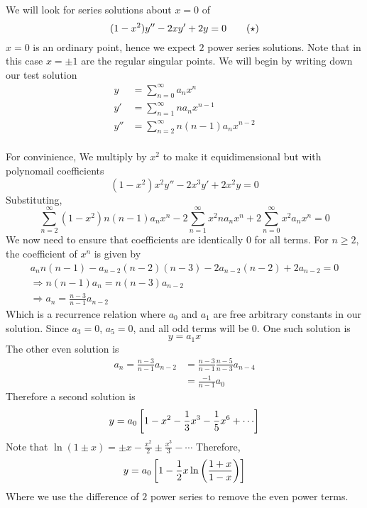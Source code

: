 \documentclass{article}
\begin{document}
\begin{eg}
    We will look for series solutions about $x = 0$ of
    \[
        (1 - x^2)y'' - 2x y' + 2y = 0 \tagstar  
    \]
    $x = 0$ is an ordinary point, hence we expect $2$ power series solutions.
    Note that in this case $x = \pm 1$ are the regular singular points.
    We will begin by writing down our test solution
    \begin{align*}
        y &= \sum_{n=0}^{\infty} a_n x^n \\
        y' &= \sum_{n=1}^{\infty} n a_n x^{n-1} \\
        y'' &= \sum_{n=2}^{\infty} n (n-1) a_n x^{n-2} \\
    \end{align*}

    For convinience, We multiply  by $x^2$ to make it equidimensional but with polynomail coefficients
    \[
        (1 - x^2)x^2 y'' - 2x^3 y' + 2x^2 y = 0
    \]
    Substituting,
    \[
        \sum_{n=2}^{\infty} (1 - x^2)n(n-1) a_n x^{n} - 2 \sum_{n=1}^{\infty} x^2 n a_n x^{n} + 2 \sum_{n=0}^{\infty} x^2 a_n x^n = 0
    \]
    We now need to ensure that coefficients are identically $0$ for all terms.
    For $n \geq 2$, the coefficient of $x^n$ is given by
    \begin{align*}
        a_n n(n-1) - a_{n-2}(n-2)(n-3) - 2a_{n-2}(n-2) + 2 a_{n-2} = 0 \\
        \Rightarrow n(n-1) a_n = n(n-3) a_{n-2} \\
        \Rightarrow a_n = \frac{n-3}{n-1}a_{n-2}
    \end{align*}
    Which is a recurrence relation where $a_0$ and $a_1$ are free arbitrary constants in our solution.
    Since $a_3 = 0$, $a_5 = 0$, and all odd terms will be $0$.
    One such solution is 
    \[
        y = a_1 x  
    \]
    The other even solution is 
    \begin{align*}
        a_n = \frac{n-3}{n-1} a_{n-2} &= \frac{n-3}{n-1} \frac{n-5}{n-3} a_{n-4} \\
        &= \frac{-1}{n-1} a_0
    \end{align*}
    Therefore a second solution is
    \[
        y = a_0\sqbkt{1 - x^2 - \frac{1}{3}x^3 - \frac{1}{5} x^6 + \cdots}  
    \]
    Note that $\ln(1 \pm x) = \pm x - \frac{x^2}{2} \pm \frac{x^3}{3} - \cdots$
    Therefore,
    \[
        y = a_0 \left[ 1 - \frac{1}{2} x \ln \left( \frac{1 + x}{1 - x} \right) \right]  
    \]
    Where we use the difference of $2$ power series to remove the even power terms.
\end{eg}
\end{document}
